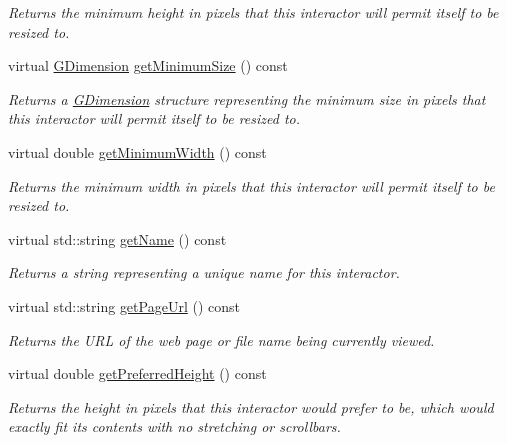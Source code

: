 \begin{DoxyCompactItemize}
\begin{DoxyCompactList}\small\item\em Returns the minimum height in pixels that this interactor will permit itself to be resized to. \end{DoxyCompactList}\item 
virtual \mbox{\hyperlink{classGDimension}{G\+Dimension}} \mbox{\hyperlink{classGInteractor_a66b5af0b32493b4d597ca0a3df2049ea}{get\+Minimum\+Size}} () const
\begin{DoxyCompactList}\small\item\em Returns a \mbox{\hyperlink{classGDimension}{G\+Dimension}} structure representing the minimum size in pixels that this interactor will permit itself to be resized to. \end{DoxyCompactList}\item 
virtual double \mbox{\hyperlink{classGInteractor_a59e668114fe3d49d2a0f28deb258f7c8}{get\+Minimum\+Width}} () const
\begin{DoxyCompactList}\small\item\em Returns the minimum width in pixels that this interactor will permit itself to be resized to. \end{DoxyCompactList}\item 
virtual std\+::string \mbox{\hyperlink{classGInteractor_a8a60438a5b55d0b2ceb35c8674b9d8c5}{get\+Name}} () const
\begin{DoxyCompactList}\small\item\em Returns a string representing a unique name for this interactor. \end{DoxyCompactList}\item 
virtual std\+::string \mbox{\hyperlink{classGBrowserPane_aa7607fcbc7eef6590fae7a2d513268de}{get\+Page\+Url}} () const
\begin{DoxyCompactList}\small\item\em Returns the U\+RL of the web page or file name being currently viewed. \end{DoxyCompactList}\item 
virtual double \mbox{\hyperlink{classGInteractor_a747de0961653847bdc6615dbf756d715}{get\+Preferred\+Height}} () const
\begin{DoxyCompactList}\small\item\em Returns the height in pixels that this interactor would prefer to be, which would exactly fit its contents with no stretching or scrollbars. \end{DoxyCompactList}\item 

\end{DoxyCompactItemize}
